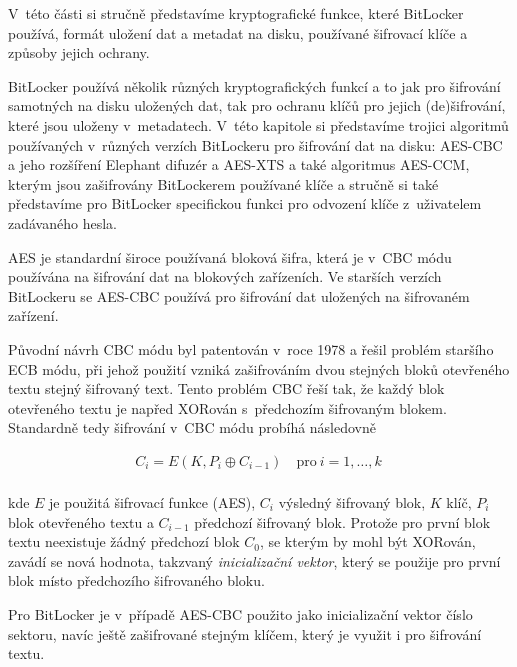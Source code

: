 V~této části si stručně představíme kryptografické funkce, které BitLocker používá, formát uložení dat a metadat na disku, používané šifrovací klíče a způsoby jejich ochrany.

\label{sec:algorithms}

BitLocker používá několik různých kryptografických funkcí a to jak pro šifrování samotných na disku uložených dat, tak pro ochranu klíčů pro jejich (de)šifrování, které jsou uloženy v~metadatech. V~této kapitole si představíme trojici algoritmů používaných v~různých verzích BitLockeru pro šifrování dat na disku: AES-CBC a jeho rozšíření Elephant difuzér a AES-XTS a také algoritmus AES-CCM, kterým jsou zašifrovány BitLockerem používané klíče a stručně si také představíme pro BitLocker specifickou funkci pro odvození klíče z~uživatelem zadávaného hesla.

\label{sec:aes-cbc}

AES je standardní široce používaná bloková šifra\cite{FIPS197}, která je v~CBC módu používána na šifrování dat na blokových zařízeních. Ve starších verzích BitLockeru se AES-CBC používá pro šifrování dat uložených na šifrovaném zařízení.

Původní návrh CBC módu byl patentován v~roce 1978\cite{Ehrsam1978} a řešil problém staršího ECB módu, při jehož použití vzniká zašifrováním dvou stejných bloků otevřeného textu stejný šifrovaný text. Tento problém CBC řeší tak, že každý blok otevřeného textu je napřed XORován s~předchozím šifrovaným blokem. Standardně tedy šifrování v~CBC módu probíhá následovně

\begin{align}
C_i = E(K, P_i \oplus C_{i-1}) \quad \text{pro}\ i = 1, \dots, k~\\ \nonumber
\end{align}

kde $E$ je použitá šifrovací funkce (AES), $C_i$ výsledný šifrovaný blok, $K$ klíč, $P_i$ blok otevřeného textu a $C_{i-1}$ předchozí šifrovaný blok. Protože pro první blok textu neexistuje žádný předchozí blok $C_0$, se kterým by mohl být XORován, zavádí se nová hodnota, takzvaný \emph{inicializační vektor}, který se použije pro první blok místo předchozího šifrovaného bloku.\cite{Kohnoc2010}


Pro BitLocker je v~případě AES-CBC použito jako inicializační vektor číslo sektoru, navíc ještě zašifrované stejným klíčem, který je využit i pro šifrování textu.

